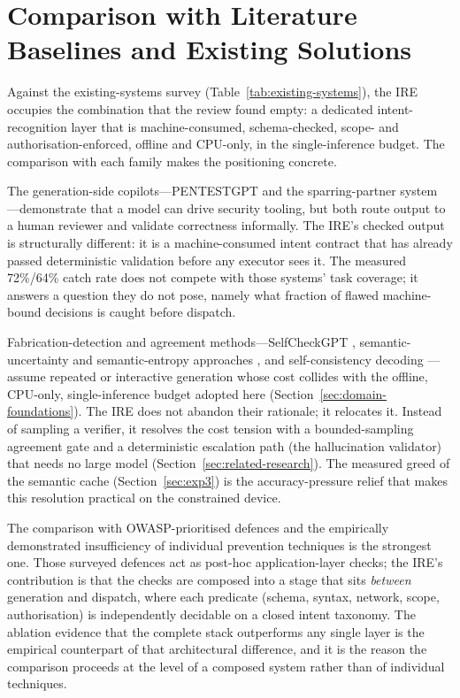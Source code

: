 \section{Comparison with Literature Baselines and Existing Solutions}\label{sec:discussion-comparison}

Against the existing-systems survey
(Table~\ref{tab:existing-systems}), the IRE occupies the combination that the
review found empty: a dedicated intent-recognition layer that is
machine-consumed, schema-checked, scope- and authorisation-enforced, offline
and CPU-only, in the single-inference budget. The comparison with each family
makes the positioning concrete.

The generation-side copilots---PENTESTGPT
\parencite{deng2024pentestgpt} and the sparring-partner system
\parencite{happe2023pwned}---demonstrate that a model can drive security
tooling, but both route output to a human reviewer and validate correctness
informally. The IRE's checked output is structurally different: it is a
machine-consumed intent contract that has already passed deterministic
validation before any executor sees it. The measured 72\%/64\% catch rate does
not compete with those systems' task coverage; it answers a question they do
not pose, namely what fraction of flawed machine-bound decisions is caught
before dispatch.

\begin{sloppypar}
Fabrication-detection and agreement methods---SelfCheckGPT
\parencite{manakul2023selfcheckgpt}, semantic-uncertainty and
semantic-entropy approaches \parencite{kuhn2023semantic,farquhar2024semantic},
and self-consistency decoding \parencite{wang2023selfconsistency}---assume
repeated or interactive generation whose cost collides with the offline,
CPU-only, single-inference budget adopted here
(Section~\ref{sec:domain-foundations}). The IRE does not abandon their
rationale; it relocates it. Instead of sampling a verifier, it resolves the
cost tension with a bounded-sampling agreement gate and a deterministic
escalation path (the hallucination validator) that needs no large model
(Section~\ref{sec:related-research}). The measured greed of the semantic cache
(Section~\ref{sec:exp3}) is the accuracy-pressure relief that makes this
resolution practical on the constrained device.
\end{sloppypar}

The comparison with OWASP-prioritised defences
\parencite{owasp2025} and the empirically demonstrated insufficiency of
individual prevention techniques \parencite{liu2023promptinjection,
greshake2023indirect, kang2024dualuse} is the strongest one. Those surveyed
defences act as post-hoc application-layer checks; the IRE's contribution is
that the checks are composed into a stage that sits \emph{between} generation
and dispatch, where each predicate (schema, syntax, network, scope,
authorisation) is independently decidable on a closed intent taxonomy. The
ablation evidence that the complete stack outperforms any single layer is the
empirical counterpart of that architectural difference, and it is the reason
the comparison proceeds at the level of a composed system rather than of
individual techniques.

